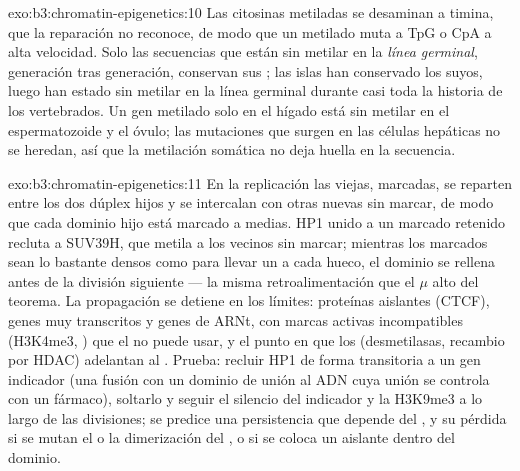 \begin{solution}{exo:b3:chromatin-epigenetics:10}
Las citosinas metiladas se desaminan a timina, que la reparación no
reconoce, de modo que un  metilado muta a TpG o CpA a alta velocidad.
Solo las secuencias que están sin metilar en la \emph{línea germinal},
generación tras generación, conservan sus ; las islas han conservado
los suyos, luego han estado sin metilar en la línea germinal durante casi
toda la historia de los vertebrados. Un gen metilado solo en el hígado
está sin metilar en el espermatozoide y el óvulo; las mutaciones que
surgen en las células hepáticas no se heredan, así que la metilación
somática no deja huella en la secuencia.
\end{solution}

\begin{solution}{exo:b3:chromatin-epigenetics:11}
En la replicación las  viejas, marcadas, se reparten entre los
dos dúplex hijos y se intercalan con otras nuevas sin marcar, de modo que
cada dominio hijo está marcado a medias. HP1 unido a un 
marcado retenido recluta a SUV39H, que metila a los vecinos sin marcar;
mientras los  marcados sean lo bastante densos como para
llevar un  a cada hueco, el dominio se rellena antes de la
división siguiente --- la misma retroalimentación que el $\mu$ alto del
teorema. La propagación se detiene en los límites: proteínas aislantes
(CTCF), genes muy transcritos y genes de ARNt,  con marcas
activas incompatibles (H3K4me3, ) que el  no puede
usar, y el punto en que los  (desmetilasas, recambio por HDAC)
adelantan al . Prueba: recluir HP1 de forma transitoria a un gen
indicador (una fusión con un dominio de unión al ADN cuya unión se
controla con un fármaco), soltarlo y seguir el silencio del indicador y
la H3K9me3 a lo largo de las divisiones; se predice una persistencia que
depende del , y su pérdida si se mutan el  o la
dimerización del , o si se coloca un aislante dentro del dominio.
\end{solution}

